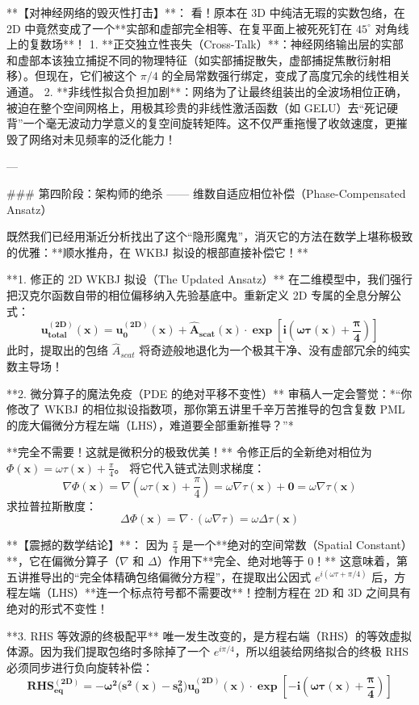 \documentclass[12pt]{article}
\begin{document}
{**【对神经网络的毁灭性打击】**：
看！原本在 3D 中纯洁无瑕的实数包络，在 2D 中竟然变成了一个**实部和虚部完全相等、在复平面上被死死钉在 $45^\circ$ 对角线上的复数场**！
1. **正交独立性丧失（Cross-Talk）**：神经网络输出层的实部和虚部本该独立捕捉不同的物理特征（如实部捕捉散失，虚部捕捉焦散衍射相移）。但现在，它们被这个 $\pi/4$ 的全局常数强行绑定，变成了高度冗余的线性相关通道。
2. **非线性拟合负担加剧**：网络为了让最终组装出的全波场相位正确，被迫在整个空间网格上，用极其珍贵的非线性激活函数（如 GELU）去“死记硬背”一个毫无波动力学意义的复空间旋转矩阵。这不仅严重拖慢了收敛速度，更摧毁了网络对未见频率的泛化能力！

---

### 第四阶段：架构师的绝杀 —— 维数自适应相位补偿（Phase-Compensated Ansatz）

既然我们已经用渐近分析找出了这个“隐形魔鬼”，消灭它的方法在数学上堪称极致的优雅：**顺水推舟，在 WKBJ 拟设的根部直接补偿它！**

**1. 修正的 2D WKBJ 拟设（The Updated Ansatz）**
在二维模型中，我们强行把汉克尔函数自带的相位偏移纳入先验基底中。重新定义 2D 专属的全息分解公式：
$$ \mathbf{u_{total}^{(2D)}(\mathbf{x}) = u_0^{(2D)}(\mathbf{x}) + \hat{A}_{scat}(\mathbf{x}) \cdot \exp\left[ i \left( \omega \tau(\mathbf{x}) + \frac{\pi}{4} \right) \right]} $$
此时，提取出的包络 $\hat{A}_{scat}$ 将奇迹般地退化为一个极其干净、没有虚部冗余的纯实数主导场！

**2. 微分算子的魔法免疫（PDE 的绝对平移不变性）**
审稿人一定会警觉：*“你修改了 WKBJ 的相位拟设指数项，那你第五讲里千辛万苦推导的包含复数 PML 的庞大偏微分方程左端（LHS），难道要全部重新推导？”*

**完全不需要！这就是微积分的极致优美！** 
令修正后的全新绝对相位为 $\Phi(\mathbf{x}) = \omega \tau(\mathbf{x}) + \frac{\pi}{4}$。
将它代入链式法则求梯度：
$$ \nabla \Phi(\mathbf{x}) = \nabla \left( \omega \tau(\mathbf{x}) + \frac{\pi}{4} \right) = \omega \nabla \tau(\mathbf{x}) + \mathbf{0} = \omega \nabla \tau(\mathbf{x}) $$
求拉普拉斯散度：
$$ \Delta \Phi(\mathbf{x}) = \nabla \cdot (\omega \nabla \tau) = \omega \Delta \tau(\mathbf{x}) $$

**【震撼的数学结论】**：
因为 $\frac{\pi}{4}$ 是一个**绝对的空间常数（Spatial Constant）**，它在偏微分算子（$\nabla$ 和 $\Delta$）作用下**完全、绝对地等于 0！**
这意味着，第五讲推导出的“完全体精确包络偏微分方程”，在提取出公因式 $e^{i(\omega \tau + \pi/4)}$ 后，方程左端（LHS）**连一个标点符号都不需要改**！控制方程在 2D 和 3D 之间具有绝对的形式不变性！

**3. RHS 等效源的终极配平**
唯一发生改变的，是方程右端（RHS）的等效虚拟体源。因为我们提取包络时多除掉了一个 $e^{i\pi/4}$，所以组装给网络拟合的终极 RHS 必须同步进行负向旋转补偿：
$$ \mathbf{\mathbf{RHS}_{eq}^{(2D)} = -\omega^2 \big( s^2(\mathbf{x}) - s_0^2 \big) u_0^{(2D)}(\mathbf{x}) \cdot \mathbf{\exp\left[ -i \left( \omega \tau(\mathbf{x}) + \frac{\pi}{4} \right) \right]}} $$

}
\end{document}
